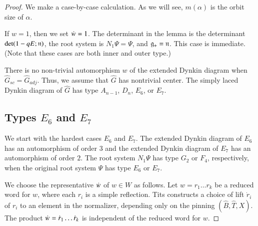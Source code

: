 \begin{proof} 
  We make a case-by-case calculation.  As we will see, $m(\alpha)$ is
  the orbit size of $\alpha$.

  If $w=1$, then we set $\dot w=1$.  The determinant in the lemma is
  the determinant $\det(1- q E;{\mathfrak n})$, the root system is $N_1\Psi
  =\Psi$, and ${\mathfrak g}_+ = {\mathfrak n}$.  This case is immediate.  (Note that these
  cases are both inner and outer type.)

  There is no non-trivial automorphism $w$ of the extended Dynkin
  diagram when $\hat G_{sc} = \hat G_{adj}$.  Thus, we assume that
  $\hat G$ has nontrivial center.  The simply laced Dynkin diagram of
  $\hat G$ has type $A_{n-1}$, $D_n$, $E_6$, or $E_7$.

\subsection{Types $E_6$ and $E_7$}
  We start with the hardest cases $E_6$ and $E_7$.  The extended
  Dynkin diagram of $E_6$ has an automorphism of order $3$ and the
  extended Dynkin diagram of $E_7$ has an automorphism of order $2$.
  The root system $N_1\Psi$ has type $G_2$ or $F_4$, respectively,
  when the original root system $\Psi$ has type $E_6$ or $E_7$.

  We choose the representative $\dot w$ of $w\in W$ as follows.  Let
  $w=r_1\ldots r_k$ be a reduced word for $w$, where each $r_i$ is a
  simple reflection.  Tits constructs a choice of lift $\dot r_i$ of
  $r_i$ to an element in the normalizer, depending only on the pinning
  $(\hat B,\hat T,X)$.  The product $\dot w = \dot r_1\ldots \dot r_k$
  is independent of the reduced word for $w$.


\end{proof}
